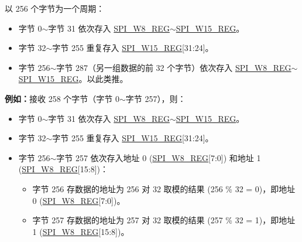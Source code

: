 \documentclass[main\_\_CN.tex]{subfiles}
\begin{document}
\begin{itemize}
\begin{itemize}
        以 256 个字节为一个周期：
        \begin{itemize}
            \item 字节 0$\sim$字节 31 依次存入 \hyperref[regdesc:SPIW0REG]{SPI\_W8\_REG}$\sim$\hyperref[regdesc:SPIW0REG]{SPI\_W15\_REG}。
            \item 字节 32$\sim$字节 255 重复存入 \hyperref[regdesc:SPIW0REG]{SPI\_W15\_REG}[31:24]。
            \item 字节 256$\sim$字节 287（另一组数据的前 32 个字节）依次存入 \hyperref[regdesc:SPIW0REG]{SPI\_W8\_REG}$\sim$\hyperref[regdesc:SPIW0REG]{SPI\_W15\_REG}。以此类推。
        \end{itemize}
        \textbf{例如：}接收 258 个字节（字节 0$\sim$字节 257），则：
        \begin{itemize}
            \item 字节 0$\sim$字节 31 依次存入 \hyperref[regdesc:SPIW0REG]{SPI\_W8\_REG}$\sim$\hyperref[regdesc:SPIW0REG]{SPI\_W15\_REG}。
            \item 字节 32$\sim$字节 255 重复存入 \hyperref[regdesc:SPIW0REG]{SPI\_W15\_REG}[31:24]。
            \item 字节 256$\sim$字节 257 依次存入地址 0 (\hyperref[regdesc:SPIW0REG]{SPI\_W8\_REG}[7:0]) 和地址 1 (\hyperref[regdesc:SPIW0REG]{SPI\_W8\_REG}[15:8])：
            \begin{itemize}
                \item 字节 256 存数据的地址为 256 对 32 取模的结果 (256 \% 32 = 0)，即地址 0 (\hyperref[regdesc:SPIW0REG]{SPI\_W8\_REG}[7:0])。
                \item 字节 257 存数据的地址为 257 对 32 取模的结果 (257 \% 32 = 1)，即地址 1 (\hyperref[regdesc:SPIW0REG]{SPI\_W8\_REG}[15:8])。
            \end{itemize}
        \end{itemize}
    \end{itemize}
\end{itemize}
\end{document}
